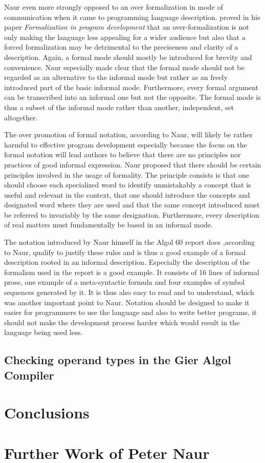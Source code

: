 \documentclass{article}
\begin{document}
Naur even more strongly opposed to an over formalization in mode of communication when it came to programming language description. \cite{naur1982formalization} proved in his paper \textit{Formalization in program development} that an over-formalization is not only making the language less appealing for a wider audience but also that a forced formalization may be detrimental to the preciseness and clarity of a description. Again, a formal mode should mostly be introduced for brevity and convenience. Naur especially made clear that the formal mode should not be regarded as an alternative to the informal mode but rather as an freely introduced part of the basic informal mode. Furthermore, every formal argument can be transcribed into an informal one but not the opposite. The formal mode is thus a subset of the informal mode rather than another, independent, set altogether. 

The over promotion of formal notation, according to Naur, will likely be rather harmful to effective program development especially because the focus on the formal notation will lead authors to believe that there are no principles nor practices of good informal expression. Naur proposed that there should be certain principles involved in the usage of formality. The principle consists is that one should choose each specialized word to identify unmistakably a concept that is useful and relevant in the context, that one should introduce the concepts and designated word where they are used and that the same concept introduced must be referred to invariably by the same designation. Furthermore, every description of real matters must fundamentally be based in an informal mode.

The notation introduced by Naur himself in the Algol 60 report does ,according to Naur, qualify to justify these rules and is thus a good example of a formal description rooted in an informal description. Especially the description of the formalism used in the report is a good example. It consists of 16 lines of informal prose, one example of a meta-syntactic formula and four examples of symbol sequences generated by it. It is thus also easy to read and to understand, which was another important point to Naur. Notation should be designed to make it easier for programmers to use the language and also to write better programs, it should not make the development process harder which would result in the language being used less.

\subsection{Checking operand types in the Gier Algol Compiler}

\section{Conclusions}

\section{Further Work of Peter Naur}



\end{document}
